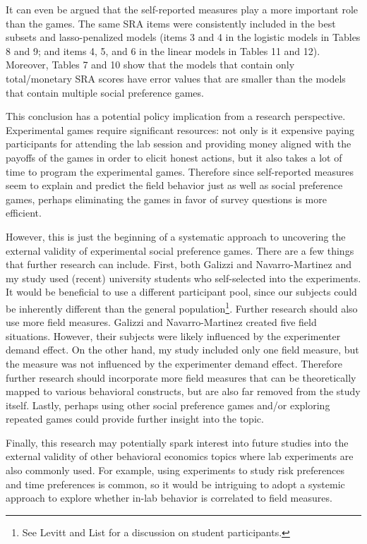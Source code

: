 \documentclass[12pt]{article}
\begin{document}
It can even be argued that the self-reported measures play a more important role than the games. The same SRA items were consistently included in the best subsets and lasso-penalized models (items 3 and 4 in the logistic models in Tables 8 and 9; and items 4, 5, and 6 in the linear models in Tables 11 and 12). Moreover, Tables 7 and 10 show that the models that contain only total/monetary SRA scores have error values that are smaller than the models that contain multiple social preference games.

This conclusion has a potential policy implication from a research perspective. Experimental games require significant resources: not only is it expensive paying participants for attending the lab session and providing money aligned with the payoffs of the games in order to elicit honest actions, but it also takes a lot of time to program the experimental games. Therefore since self-reported measures seem to explain and predict the field behavior just as well as social preference games, perhaps eliminating the games in favor of survey questions is more efficient.

However, this is just the beginning of a systematic approach to uncovering the external validity of experimental social preference games. There are a few things that further research can include. First, both Galizzi and Navarro-Martinez and my study used (recent) university students who self-selected into the experiments. It would be beneficial to use a different participant pool, since our subjects could be inherently different than the general population\footnote{See Levitt and List for a discussion on student participants.}. Further research should also use more field measures. Galizzi and Navarro-Martinez created five field situations. However, their subjects were likely influenced by the experimenter demand effect. On the other hand, my study included only one field measure, but the measure was not influenced by the experimenter demand effect. Therefore further research should incorporate more field measures that can be theoretically mapped to various behavioral constructs, but are also far removed from the study itself. Lastly, perhaps using other social preference games and/or exploring repeated games could provide further insight into the topic.

Finally, this research may potentially spark interest into future studies into the external validity of other behavioral economics topics where lab experiments are also commonly used. For example, using experiments to study risk preferences and time preferences is common, so it would be intriguing to adopt a systemic approach to explore whether in-lab behavior is correlated to field measures.
\end{document}
